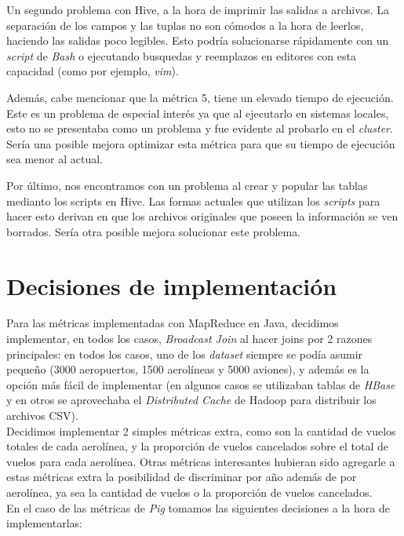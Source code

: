 \documentclass[a4paper,10pt]{article}
\begin{document}
Un segundo problema con Hive, a la hora de imprimir las salidas a archivos. La separación de los campos y las tuplas no son cómodos a la hora de leerlos, haciendo las salidas poco legibles. Esto podría solucionarse rápidamente con un \textit{script} de \textit{Bash} o ejecutando busquedas y reemplazos en editores con esta capacidad (como por ejemplo, \textit{vim}).

Además, cabe mencionar que la métrica 5, tiene un elevado tiempo de ejecución. Este es un problema de especial interés ya que al ejecutarlo en sistemas locales, esto no se presentaba como un problema y fue evidente al probarlo en el \textit{cluster}. Sería una posible mejora optimizar esta métrica para que su tiempo de ejecución sea menor al actual.

Por último, nos encontramos con un problema al crear y popular las tablas medianto los scripts en Hive. Las formas actuales que utilizan los \textit{scripts} para hacer esto derivan en que los archivos originales que poseen la información se ven borrados. Sería otra posible mejora solucionar este problema.

\section{Decisiones de implementación}

Para las métricas implementadas con MapReduce en Java, decidimos implementar, en todos los casos, \textit{Broadcast Join} al hacer joins por 2 razones principales: en todos los casos,
uno de los \textit{dataset} siempre se podía asumir pequeño (3000 aeropuertos, 1500 aerolíneas y 5000 aviones), y además es la opción más fácil de implementar (en algunos casos se
utilizaban tablas de \textit{HBase} y en otros se aprovechaba el \textit{Distributed Cache} de Hadoop para distribuir los archivos CSV).\\

Decidimos implementar 2 simples métricas extra, como son la cantidad de vuelos totales de cada aerolínea, y la proporción de vuelos cancelados sobre el total de vuelos para cada
aerolínea. Otras métricas interesantes hubieran sido agregarle a estas métricas extra la posibilidad de discriminar por año además de por aerolínea, ya sea la cantidad de vuelos
o la proporción de vuelos cancelados.\\

En el caso de las métricas de \textit{Pig} tomamos las siguientes decisiones a la hora de implementarlas:\\
\end{document}
